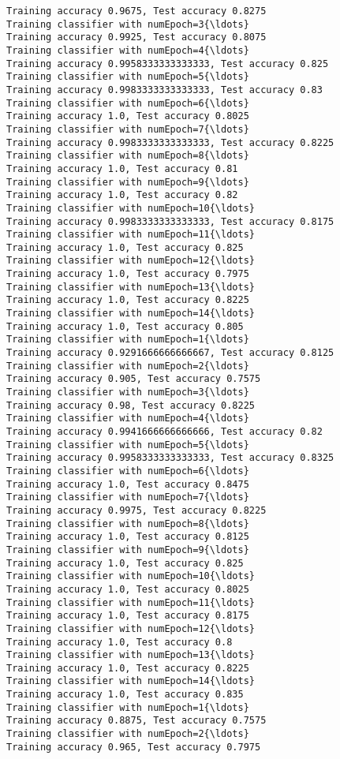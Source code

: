 \documentclass[11pt]{article}
\begin{document}
\begin{Verbatim}[commandchars=\\\{\}]
Training accuracy 0.9675, Test accuracy 0.8275
Training classifier with numEpoch=3{\ldots}
Training accuracy 0.9925, Test accuracy 0.8075
Training classifier with numEpoch=4{\ldots}
Training accuracy 0.9958333333333333, Test accuracy 0.825
Training classifier with numEpoch=5{\ldots}
Training accuracy 0.9983333333333333, Test accuracy 0.83
Training classifier with numEpoch=6{\ldots}
Training accuracy 1.0, Test accuracy 0.8025
Training classifier with numEpoch=7{\ldots}
Training accuracy 0.9983333333333333, Test accuracy 0.8225
Training classifier with numEpoch=8{\ldots}
Training accuracy 1.0, Test accuracy 0.81
Training classifier with numEpoch=9{\ldots}
Training accuracy 1.0, Test accuracy 0.82
Training classifier with numEpoch=10{\ldots}
Training accuracy 0.9983333333333333, Test accuracy 0.8175
Training classifier with numEpoch=11{\ldots}
Training accuracy 1.0, Test accuracy 0.825
Training classifier with numEpoch=12{\ldots}
Training accuracy 1.0, Test accuracy 0.7975
Training classifier with numEpoch=13{\ldots}
Training accuracy 1.0, Test accuracy 0.8225
Training classifier with numEpoch=14{\ldots}
Training accuracy 1.0, Test accuracy 0.805
Training classifier with numEpoch=1{\ldots}
Training accuracy 0.9291666666666667, Test accuracy 0.8125
Training classifier with numEpoch=2{\ldots}
Training accuracy 0.905, Test accuracy 0.7575
Training classifier with numEpoch=3{\ldots}
Training accuracy 0.98, Test accuracy 0.8225
Training classifier with numEpoch=4{\ldots}
Training accuracy 0.9941666666666666, Test accuracy 0.82
Training classifier with numEpoch=5{\ldots}
Training accuracy 0.9958333333333333, Test accuracy 0.8325
Training classifier with numEpoch=6{\ldots}
Training accuracy 1.0, Test accuracy 0.8475
Training classifier with numEpoch=7{\ldots}
Training accuracy 0.9975, Test accuracy 0.8225
Training classifier with numEpoch=8{\ldots}
Training accuracy 1.0, Test accuracy 0.8125
Training classifier with numEpoch=9{\ldots}
Training accuracy 1.0, Test accuracy 0.825
Training classifier with numEpoch=10{\ldots}
Training accuracy 1.0, Test accuracy 0.8025
Training classifier with numEpoch=11{\ldots}
Training accuracy 1.0, Test accuracy 0.8175
Training classifier with numEpoch=12{\ldots}
Training accuracy 1.0, Test accuracy 0.8
Training classifier with numEpoch=13{\ldots}
Training accuracy 1.0, Test accuracy 0.8225
Training classifier with numEpoch=14{\ldots}
Training accuracy 1.0, Test accuracy 0.835
Training classifier with numEpoch=1{\ldots}
Training accuracy 0.8875, Test accuracy 0.7575
Training classifier with numEpoch=2{\ldots}
Training accuracy 0.965, Test accuracy 0.7975

\end{Verbatim}
\end{document}

